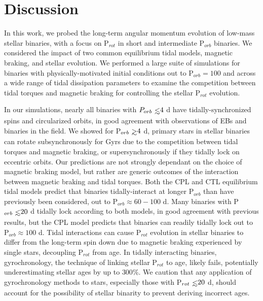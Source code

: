 
\section{Discussion} \label{sync:sec:discussion}

In this work, we probed the long-term angular momentum evolution of low-mass stellar binaries, with a focus on P$_{rot}$ in short and intermediate P$_{orb}$ binaries.  We considered the impact of two common equilibrium tidal models, magnetic braking, and stellar evolution.  We performed a large suite of simulations for binaries with physically-motivated initial conditions out to P$_{orb} = 100$ and across a wide range of tidal dissipation parameters to examine the competition between tidal torques and magnetic braking for controlling the stellar P$_{rot}$ evolution. 

In our simulations, nearly all binaries with $P_{orb} \lsim 4$ d have tidally-synchronized spins and circularized orbits, in good agreement with observations of \kepler EBs and binaries in the field. We showed for P$_{orb} \gsim 4$ d, primary stars in stellar binaries can rotate subsynchronously for Gyrs due to the competition between tidal torques and magnetic braking, or supersynchronously if they tidally lock on eccentric orbits. Our predictions are not strongly dependant on the choice of magnetic braking model, but rather are generic outcomes of the interaction between magnetic braking and tidal torques.  Both the CPL and CTL equilibrium tidal models predict that binaries tidally-interact at longer P$_{orb}$ than have previously been considered, out to P$_{orb} \approx 60-100$ d. Many binaries with P$_{orb} \lsim 20$ d tidally lock according to both models, in good agreement with previous results, but the CPL model predicts that binaries can readily tidally lock out to P$_{orb} \approx 100$ d. Tidal interactions can cause P$_{rot}$ evolution in stellar binaries to differ from the long-term spin down due to magnetic braking experienced by single stars, decoupling P$_{rot}$ from age.  In tidally interacting binaries, gyrochronology, the technique of linking stellar P$_{rot}$ to age, likely fails, potentially underestimating stellar ages by up to $300\%$. We caution that any application of gyrochronology methods to stars, especially those with P$_{rot} \lsim 20$ d, should account for the possibility of stellar binarity to prevent deriving incorrect ages. 


